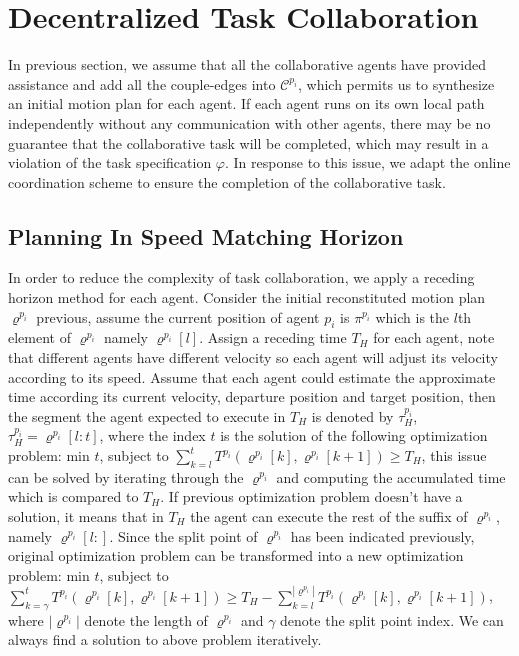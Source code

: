 \documentclass[journal]{IEEEtran}
\begin{document}
\section{Decentralized Task Collaboration}
In previous section, we assume that all the collaborative agents have provided assistance and add all the couple-edges into $\mathcal{C}^{p_i}$, which permits us to synthesize an initial motion plan for each agent. If each agent runs on its own local path independently without any communication with other agents, there may be no guarantee that the collaborative task will be completed, which may result in a violation of the task specification $\varphi$. In response to this issue, we adapt the online coordination scheme to ensure the completion of the collaborative task.
\subsection{Planning In Speed Matching Horizon}
In order to reduce the complexity of task collaboration, we apply a receding horizon method for each agent. Consider the initial reconstituted motion plan $\varrho^{p_i}$ previous, assume the current position of agent $p_i$ is $\pi^{p_i}$ which is the $l$th element of $\varrho^{p_i}$ namely $\varrho^{p_i}[l]$. Assign a receding time $T_H$ for each agent, note that different agents have different velocity so each agent will adjust its velocity according to its speed. Assume that each agent could estimate the approximate time according its current velocity, departure position and target position, then the segment the agent expected to execute in $T_H$ is denoted by $\tau^{p_i}_H$, $\tau^{p_i}_H = \varrho^{p_i}[l:t]$, where the index $t$ is the solution of the following optimization problem: min $t$, subject to $\sum_{k=l}^{t}T^{p_i}(\varrho^{p_i}[k],\varrho^{p_i}[k+1])\geq T_H$, this issue can be solved by iterating through the $\varrho^{p_i}$ and computing the accumulated time which is compared to $T_H$. If previous optimization problem doesn't have a solution, it means that in $T_H$ the agent can execute the rest of the suffix of $\varrho^{p_i}$, namely $\varrho^{p_i}[l:]$. Since the split point of $\varrho^{p_i}$ has been indicated previously, original optimization problem can be transformed into a new optimization problem: min $t$, subject to $\sum_{k=\gamma}^{t}T^{p_i}(\varrho^{p_i}[k],\varrho^{p_i}[k+1])\geq T_H - \sum_{k=l}^{|\varrho^{p_i}|}T^{p_i}(\varrho^{p_i}[k],\varrho^{p_i}[k+1])$, where $|\varrho^{p_i}|$ denote the length of $\varrho^{p_i}$ and $\gamma$ denote the split point index. We can always find a solution to above problem iteratively.
\end{document}

